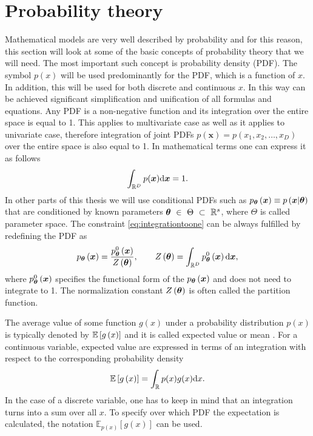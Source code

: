 \section{Probability theory}
Mathematical models are very well described by probability and for this reason, this section will look at some of the basic concepts of probability theory that we will need. The most important such concept is probability density (PDF). The symbol $p(x)$ will be used predominantly for the PDF, which is a function of $x$.  In addition, this will be used for both discrete and continuous $x$. In this way can be achieved significant simplification and unification of all formulas and equations. Any PDF is a non-negative function and its integration over the entire space is equal to 1. This applies to multivariate case as well as it applies to univariate case, therefore integration of joint PDFs $p(\boldsymbol{x}) = p\left(x_1, x_2, \dots, x_D\right)$ over the entire space is also equal to 1. In mathematical terms one can express it as follows
\begin{equation}\label{eq:integrationtoone}
\int_{\mathbb{R}^D}p(\boldsymbol{x})\mathrm{d}{\boldsymbol{x}} = 1.
\end{equation}
In other parts of this thesis we will use conditional PDFs such as $p_{\boldsymbol{\theta}}\left(\boldsymbol{x}\right) \equiv p\left(\boldsymbol{x}|\boldsymbol{\theta}\right)  $ that are conditioned by known parameters $\boldsymbol{\theta}~\in~\Theta~\subset~\mathbb{R}^s$, where $\Theta$ is called parameter space. The constraint \eqref{eq:integrationtoone} can be always fulfilled by redefining the PDF as
\begin{equation}\label{eq:partitionfunction}
    p_{\boldsymbol{\theta}}\left(\boldsymbol{x}\right) = \frac{p_{\boldsymbol{\theta}}^{0}\left(\boldsymbol{x}\right)}{Z\left(\boldsymbol{\theta}\right)}, \qquad Z\left(\boldsymbol{\theta}\right) = \int_{\mathbb{R}^D} p_{\boldsymbol{\theta}}^0\left(\boldsymbol{x}\right)\mathrm{d}{\boldsymbol{x}}, 
\end{equation}
where $p_{\boldsymbol{\theta}}^{0}\left(\boldsymbol{x}\right)$ specifies the functional form of the $p_{\boldsymbol{\theta}}\left(\boldsymbol{x}\right)$ and does not need to integrate to 1. The normalization constant $Z\left(\boldsymbol{\theta}\right)$ is often called the partition function.

The average value of some function $g(x)$ under a probability distribution $p(x)$ is typically denoted by $\mathbb{E}\left[ g\left(x\right) \right]$ and it is called expected value or mean \cite{bishop}. For a continuous variable, expected value are expressed in terms of an integration with respect to the corresponding probability density
\begin{equation}
	\mathbb{E}\left[ g\left(x\right) \right] = \int_{\mathbb{R}} p(x)g(x)\mathrm{d}{x}.
\end{equation} 
In the case of a discrete variable, one has to keep in mind that an integration turns into a sum over all $x$. To specify over which PDF the expectation is calculated, the notation $\mathbb{E}_{p(x)}\left[g\left(x\right)\right]$ can be used.

